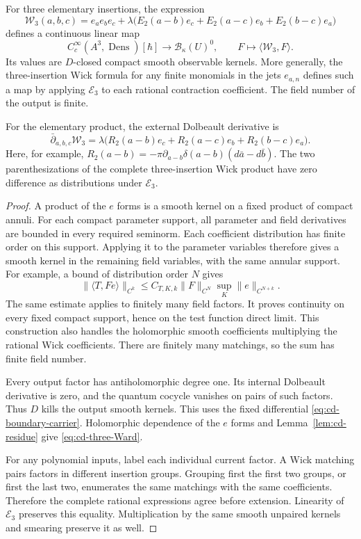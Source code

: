 \begin{proposition}
\label{prop:cd-smeared}
For three elementary insertions, the expression
\begin{equation}
 \label{eq:cd-three-current}
 \mathscr W_3(a,b,c)=e_ae_be_c+
 \lambda\bigl(E_2(a-b)e_c+E_2(a-c)e_b+E_2(b-c)e_a\bigr)
\end{equation}
defines a continuous linear map
\[
 C_c^\infty(A^3,\operatorname{Dens})[\hbar]
       \longrightarrow\mathcal B_\kappa(U)^0,
 \qquad F\longmapsto\langle\mathscr W_3,F\rangle.
\]
Its values are $D$-closed compact smooth observable kernels.
More generally, the three-insertion Wick formula for any finite monomials
in the jets $e_{a,n}$ defines such a map by applying $\mathcal E_3$
to each rational contraction coefficient.
The field number of the output is finite.

For the elementary product, the external Dolbeault derivative is
\begin{equation}
 \label{eq:cd-three-Ward}
 \bar\partial_{a,b,c}\mathscr W_3
 =\lambda\bigl(R_2(a-b)e_c+R_2(a-c)e_b+R_2(b-c)e_a\bigr).
\end{equation}
Here, for example,
$R_2(a-b)=-\pi\partial_{a-b}\delta(a-b)(d\bar a-d\bar b)$.
The two parenthesizations of the complete three-insertion Wick product
have zero difference as distributions under $\mathcal E_3$.
\end{proposition}
\begin{proof}
A product of the $e$ forms is a smooth kernel on a fixed product of
compact annuli.  For each compact parameter support, all parameter and
field derivatives are bounded in every required seminorm.
Each coefficient distribution has finite order on this support.
Applying it to the parameter variables therefore gives a smooth kernel
in the remaining field variables, with the same annular support.
For example, a bound of distribution order $N$ gives
\[
 \|\langle T,F e\rangle\|_{C^k}
 \le C_{T,K,k}\|F\|_{C^N}
       \sup_K\|e\|_{C^{N+k}}.
\]
The same estimate applies to finitely many field factors.
It proves continuity on every fixed compact support, hence on the test
function direct limit.  This construction also handles the holomorphic
smooth coefficients multiplying the rational Wick coefficients.
There are finitely many matchings, so the sum has finite field number.

Every output factor has antiholomorphic degree one.
Its internal Dolbeault derivative is zero, and the quantum cocycle vanishes
on pairs of such factors.  Thus $D$ kills the output smooth kernels.
This uses the fixed differential \eqref{eq:cd-boundary-carrier}.
Holomorphic dependence of the $e$ forms and
Lemma~\ref{lem:cd-residue} give \eqref{eq:cd-three-Ward}.

For any polynomial inputs, label each individual current factor.
A Wick matching pairs factors in different insertion groups.
Grouping first the first two groups, or first the last two, enumerates
the same matchings with the same coefficients.  Therefore the complete
rational expressions agree before extension.  Linearity of $\mathcal E_3$
preserves this equality.  Multiplication by the same smooth unpaired
kernels and smearing preserve it as well.
\end{proof}

